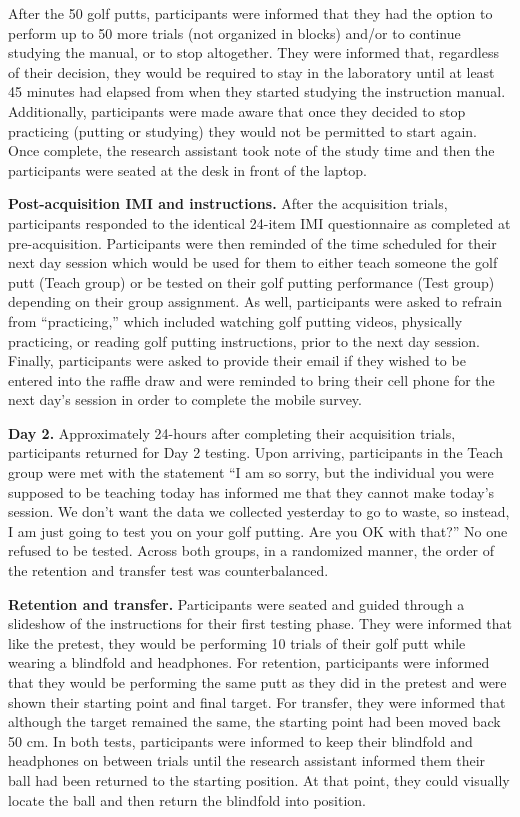\documentclass[
  english,
  man,floatsintext]{apa7}
\begin{document}
After the 50 golf putts, participants were informed that they had the option to perform up to 50 more trials (not organized in blocks) and/or to continue studying the manual, or to stop altogether. They were informed that, regardless of their decision, they would be required to stay in the laboratory until at least 45 minutes had elapsed from when they started studying the instruction manual. Additionally, participants were made aware that once they decided to stop practicing (putting or studying) they would not be permitted to start again. Once complete, the research assistant took note of the study time and then the participants were seated at the desk in front of the laptop.

\textbf{Post-acquisition IMI and instructions.} After the acquisition trials, participants responded to the identical 24-item IMI questionnaire as completed at pre-acquisition. Participants were then reminded of the time scheduled for their next day session which would be used for them to either teach someone the golf putt (Teach group) or be tested on their golf putting performance (Test group) depending on their group assignment. As well, participants were asked to refrain from ``practicing,'' which included watching golf putting videos, physically practicing, or reading golf putting instructions, prior to the next day session. Finally, participants were asked to provide their email if they wished to be entered into the raffle draw and were reminded to bring their cell phone for the next day's session in order to complete the mobile survey.

\textbf{Day 2.} Approximately 24-hours after completing their acquisition trials, participants returned for Day 2 testing. Upon arriving, participants in the Teach group were met with the statement ``I am so sorry, but the individual you were supposed to be teaching today has informed me that they cannot make today's session. We don't want the data we collected yesterday to go to waste, so instead, I am just going to test you on your golf putting. Are you OK with that?'' No one refused to be tested. Across both groups, in a randomized manner, the order of the retention and transfer test was counterbalanced.

\textbf{Retention and transfer.} Participants were seated and guided through a slideshow of the instructions for their first testing phase. They were informed that like the pretest, they would be performing 10 trials of their golf putt while wearing a blindfold and headphones. For retention, participants were informed that they would be performing the same putt as they did in the pretest and were shown their starting point and final target. For transfer, they were informed that although the target remained the same, the starting point had been moved back 50 cm. In both tests, participants were informed to keep their blindfold and headphones on between trials until the research assistant informed them their ball had been returned to the starting position. At that point, they could visually locate the ball and then return the blindfold into position.
\end{document}

